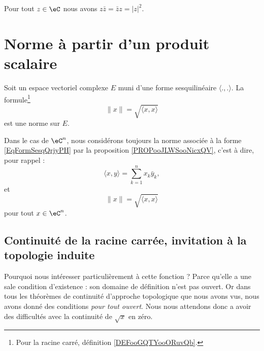 \begin{lemma}   \label{LEMooONLNooXLNbtB}
	Pour tout \( z\in \eC\) nous avons \( z\bar z=\bar z z=| z |^2\).
\end{lemma}

\section{Norme à partir d'un produit scalaire}

\begin{proposition}            \label{PROPooJLWSooNicxQV}
	Soit un espace vectoriel complexe \( E\) muni d'une forme sesquilinéaire \( \langle ., .\rangle \). La formule\footnote{Pour la racine carré, définition \ref{DEFooGQTYooORuvQb}.}
	\begin{equation}        \label{EQooZIXRooMGcsXY}
		\| x \|=  \sqrt{ \langle x, x\rangle }
	\end{equation}
	est une norme sur \( E\).
\end{proposition}


\begin{definition}      \label{DEFooGUXNooXwCsrq}
	Dans le cas de \( \eC^n\), nous considérons toujours la norme associée à la forme \eqref{EqFormSesqQrjyPH} par la proposition \ref{PROPooJLWSooNicxQV}, c'est à dire, pour rappel :
	\begin{equation}
		\langle x, y\rangle =\sum_{k=1}^nx_k\bar y_k,
	\end{equation}
	et
	\begin{equation}
		\| x \|=  \sqrt{ \langle x, x\rangle }
	\end{equation}
	pour tout \( x\in \eC^n\).
\end{definition}


\subsection{Continuité de la racine carrée, invitation à la topologie induite}

Pourquoi nous intéresser particulièrement à cette fonction ? Parce qu'elle a une sale condition d'existence : son domaine de définition n'est pas ouvert. Or dans tous les théorèmes de continuité d'approche topologique que nous avons vus, nous avons donné des conditions \emph{pour tout ouvert}. Nous nous attendons donc a avoir des difficultés avec la continuité de $\sqrt{x}$ en zéro.

